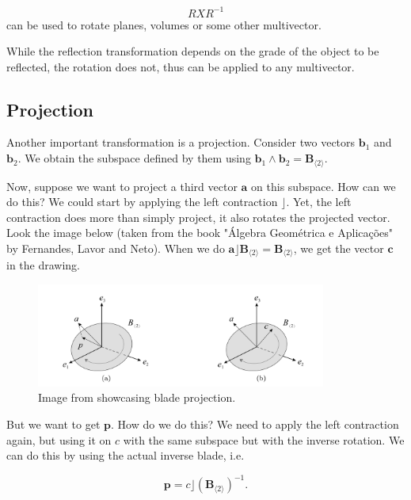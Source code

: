 \begin{displaymath}
    R X R^{-1}
\end{displaymath}
can be used to rotate planes, volumes or some other multivector.

While the reflection transformation depends on the grade of the object to be reflected,
the rotation does not, thus can be applied to any multivector.

\subsection{Projection}

Another important transformation is a projection. Consider two vectors $\mathbf b_1$ and
$\mathbf b_2$. We obtain the subspace defined by them using $\mathbf b_1 \wedge \mathbf b_2 = \mathbf B_{\langle 2\rangle}$.

Now, suppose we want to project a third vector $\mathbf a$ on this subspace. How can we do this?
We could start by applying the left contraction $\rfloor$. Yet, the left contraction
does more than simply project, it also rotates the projected vector. Look the image below (taken from the
book "Álgebra Geométrica e Aplicações" by Fernandes, Lavor and Neto). When we do
$\mathbf a \rfloor \mathbf B_{\langle 2 \rangle} = \mathbf B_{\langle 2\rangle}$, we get the vector $\mathbf c$
in the drawing.

\begin{figure}[H]
    \begin{center}
        \includegraphics[width=0.85\textwidth]{figures/bladeprojection.png}
    \end{center}
    \caption{Image from \citet{dorst2010geometric} showcasing blade projection.}
    \label{fig:bladeprojection}
\end{figure}

But we want to get $\mathbf p$. How do we do this? We need to apply the left contraction again, but
using it on $c$ with the same subspace but with the inverse rotation. We can do this by using the actual
inverse blade, i.e.

\begin{displaymath}
    \mathbf p = c \rfloor \left(\mathbf B_{\langle 2 \rangle}\right)^{-1}.
\end{displaymath}

